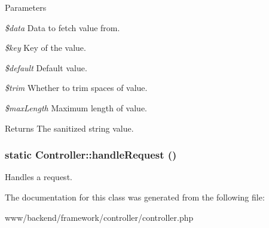 \begin{DoxyParams}{Parameters}
\item[{\em \$data}]Data to fetch value from. \item[{\em \$key}]Key of the value. \item[{\em \$default}]Default value. \item[{\em \$trim}]Whether to trim spaces of value. \item[{\em \$maxLength}]Maximum length of value.\end{DoxyParams}
\begin{DoxyReturn}{Returns}
The sanitized string value. 
\end{DoxyReturn}
\hypertarget{classController_a772b295e218a0ae1b1614239a441baee}{
\subsubsection[{handleRequest}]{\setlength{\rightskip}{0pt plus 5cm}static Controller::handleRequest ()}}
\label{classController_a772b295e218a0ae1b1614239a441baee}
Handles a request. 

The documentation for this class was generated from the following file:\begin{DoxyCompactItemize}
\item 
www/backend/framework/controller/controller.php\end{DoxyCompactItemize}
